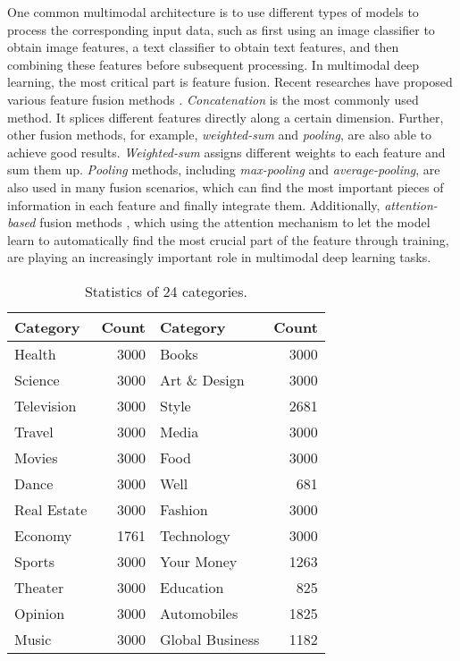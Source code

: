 \documentclass[10pt, a4paper]{article}
\begin{document}
One common multimodal architecture is to use different types of models to process the corresponding input data, such as first using an image classifier to obtain image features, a text classifier to obtain text features, and then combining these features before subsequent processing. In multimodal deep learning, the most critical part is feature fusion. 
Recent researches have proposed various feature fusion methods \cite{zhang2020multimodal}. \textit{Concatenation} \cite{nojavanasghari2016deep,anastasopoulos2019neural} is the most commonly used method. It splices different features directly along a certain dimension.
Further, other fusion methods, for example, \textit{weighted-sum} and \textit{pooling}, are also able to achieve good results.
\textit{Weighted-sum} \cite{vielzeuf2018centralnet} assigns different weights to each feature and sum them up. \textit{Pooling} \cite{chao2015long} methods, including \textit{max-pooling} and \textit{average-pooling}, are also used in many fusion scenarios, which can find the most important pieces of information in each feature and finally integrate them.
Additionally, \textit{attention-based} fusion methods \cite{zhang2020tell,shih2016look}, which using the attention mechanism to let the model learn to automatically find the most crucial part of the feature through training, are playing an increasingly important role in multimodal deep learning tasks.

\begin{table}[]
\centering
\begin{tabular}{lrlr}
\toprule
\textbf{Category}    & \multicolumn{1}{l}{\textbf{Count}} & \textbf{Category}         & \multicolumn{1}{l}{\textbf{Count}} \\\hline
Health      & 3000  & Books            & 3000  \\
Science     & 3000  & Art \& Design    & 3000  \\
Television  & 3000  & Style            & 2681  \\
Travel      & 3000  & Media            & 3000  \\
Movies      & 3000  & Food             & 3000  \\
Dance       & 3000  & Well             & 681   \\
Real Estate & 3000  & Fashion          & 3000  \\
Economy     & 1761  & Technology       & 3000  \\
Sports      & 3000  & Your Money       & 1263  \\
Theater     & 3000  & Education        & 825   \\
Opinion     & 3000  & Automobiles      & 1825  \\
Music       & 3000  & Global Business  & 1182  \\\bottomrule
\end{tabular}
\caption{Statistics of 24 categories.}
\label{tab:statistics}
\end{table}
\end{document}
